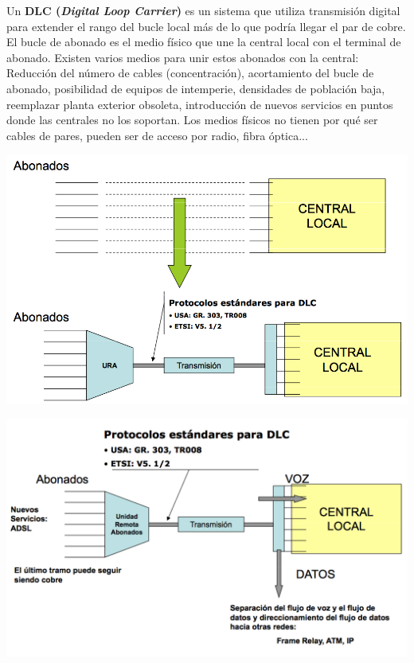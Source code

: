 \documentclass[10pt,portrait, twocolumn]{article}
\makeatletter
\renewcommand{\subsubsection}{\@startsection{subsubsection}{3}{0mm}%
                                {-1ex plus -.5ex minus -.2ex}%
                                {1ex plus .2ex}%
                                {\normalfont\small\bfseries}}
\makeatother
\begin{document}

Un \textbf{DLC (\textit{Digital Loop Carrier})} es un sistema que utiliza transmisión digital para extender el rango del bucle local más de lo que podría llegar el par de cobre. El bucle de abonado es el medio físico que une la central local con el terminal de abonado. Existen varios medios para unir estos abonados con la central: Reducción del número de cables (concentración), acortamiento del bucle de abonado, posibilidad de equipos de intemperie, densidades de población baja, reemplazar planta exterior obsoleta, introducción de nuevos servicios en puntos donde las centrales no los soportan. Los medios físicos no tienen por qué ser cables de pares, pueden ser de acceso por radio, fibra óptica...

	\begin{center}
		\includegraphics[scale=0.4]{images/DLC1}
	\end{center}
	
	\begin{center}
		\includegraphics[scale=0.4]{images/DLC2}
	\end{center}
\end{document}
